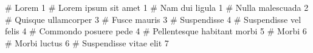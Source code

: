 \documentclass{article}
\begin{document}
# Lorem	1
	# Lorem ipsum sit amet	1
	# Nam dui ligula	1
	# Nulla malescuada	2
	# Quisque ullamcorper	3
	# Fusce mauris	3
# Suspendisse	4
	# Suspendisse vel felis	4
	# Commondo posuere pede	4
	# Pellentesque habitant morbi	5
# Morbi	6
	# Morbi luctus	6
	# Suspendisse vitae elit	7
\end{document}

